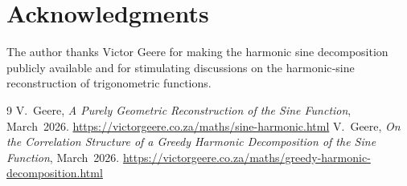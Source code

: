 \documentclass[11pt,a4paper]{article}
\begin{document}
\section*{Acknowledgments}
The author thanks Victor Geere for making the harmonic sine decomposition publicly available and for stimulating discussions on the harmonic‑sine reconstruction of trigonometric functions.

\begin{thebibliography}{9}
V.~Geere, \emph{A Purely Geometric Reconstruction of the Sine Function},
March~2026. \url{https://victorgeere.co.za/maths/sine-harmonic.html}
V.~Geere, \emph{On the Correlation Structure of a Greedy Harmonic Decomposition of the Sine Function},
March~2026. \url{https://victorgeere.co.za/maths/greedy-harmonic-decomposition.html}
\end{thebibliography}
\end{document}
